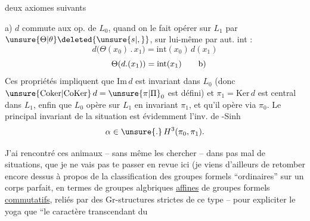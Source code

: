 deux axiomes suivants

a) $d$ commute aux op. de $L_0$, quand on le fait opérer sur $L_1$ par $\unsure{\Theta|\theta}\deleted{\unsure{s|,}}$, sur lui-même par aut. int :
\[
d\bigl(\Theta(x_0)\mathbin{.}x_1\bigr)=\mathrm{int}(x_0)\,d(x_1)
\]
\[
\Theta(d.(x_1))=\mathrm{int}(x_1)\tag*{\makebox[0pt][r]{\makebox[\displaywidth][l]{b)}}}
\]
Ces propriétés impliquent que $\mathrm{Im}\,d$ est invariant dans $L_0$ (donc $\unsure{\mathrm{Coker}|\mathrm{CoKer}}\,d=\unsure{\pi|\Pi}_0$ est défini) et $\pi_1=\mathrm{Ker}\,d$ est central dans $L_1$, enfin que $L_0$ opère sur $L_1$ en invariant $\pi_1$, et qu'il opère via $\pi_0$. Le principal invariant  de la situation est évidemment l'inv. de -Sinh
\[
\alpha\in\unsure{.}\,H^3(\pi_0,\pi_1).
\]

J'ai rencontré ces animaux -- sans même les chercher -- dans pas mal de situations, que je ne vais pas te passer en revue ici (je viens d'ailleurs de retomber encore dessus à propos de la classification des groupes formels ``ordinaires'' sur un corps parfait, en termes de groupes algbriques \uline{affines}\unsure{,|;} de groupes formels \uline{commutatifs}, reliés par des Gr-structures strictes de ce type -- pour expliciter le yoga que ``le caractère transcendant du

